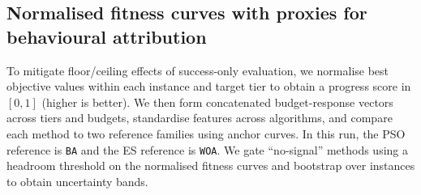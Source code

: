 \subsection{Normalised fitness curves with proxies for behavioural attribution}
To mitigate floor/ceiling effects of success-only evaluation, we normalise best objective values within each instance and target tier to obtain a progress score in $[0,1]$ (higher is better). We then form concatenated budget-response vectors across tiers and budgets, standardise features across algorithms, and compare each method to two reference families using anchor curves. In this run, the PSO reference is \texttt{BA} and the ES reference is \texttt{WOA}. We gate ``no-signal'' methods using a headroom threshold on the normalised fitness curves and bootstrap over instances to obtain uncertainty bands.
